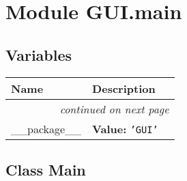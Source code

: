 %
%
%


\section{Module GUI.main}

    \label{GUI:main}


  \subsection{Variables}

    \vspace{-1cm}
\hspace{\varindent}\begin{longtable}{|p{\varnamewidth}|p{\vardescrwidth}|l}
\cline{1-2}
\cline{1-2} \centering \textbf{Name} & \centering \textbf{Description}& \\
\cline{1-2}
\endhead\cline{1-2}\multicolumn{3}{r}{\small\textit{continued on next page}}\\\endfoot\cline{1-2}
\endlastfoot\raggedright \_\-\_\-p\-a\-c\-k\-a\-g\-e\-\_\-\_\- & \raggedright \textbf{Value:} 
{\tt \texttt{'}\texttt{GUI}\texttt{'}}&\\
\cline{1-2}
\end{longtable}



\subsection{Class Main}

